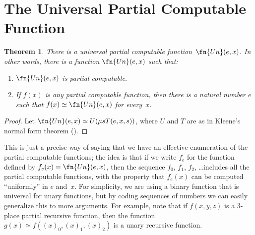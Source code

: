 \documentclass[10pt,a4paper]{article}
\makeatletter
\theoremstyle{plain}
\newtheorem{thm}{Theorem}[section]
\theoremstyle{definition}
\theoremstyle{remark}
\newenvironment{explain}{}{}
\newcommand*{\olfileid}[3]{}
\newcommand*{\olsection}[1]{\section*{#1}}
\newcommand*{\ollabel}[1]{\label{#1}}
\newcommand{\olref}{\@ifnextchar[{\olref@i}{\olref@final}}
\def\olref@i[#1]{\@ifnextchar[{\olref@ii}{\olref@final}}
\def\olref@ii[#1]{\@ifnextchar[{\olref@iii}{\olref@final}}
\def\olref@iii[#1]{\olref@final}
\def\olref@final#1{\ref{#1}}
\providecommand{\umin}{\mu}
\makeatother
\begin{document}
\olfileid{cmp}{thy}{uni}
\olsection{The Universal Partial Computable Function}

\begin{thm}
\ollabel{thm:univ-comp}
There is a universal partial computable function~$\fn{Un}(e,x)$. In other
words, there is a function $\fn{Un}(e,x)$ such that:
\begin{enumerate}
\item $\fn{Un}(e,x)$ is partial computable.
\item If $f(x)$ is any partial computable function, then there is a
natural number $e$ such that $f(x) \simeq \fn{Un}(e,x)$ for every~$x$.
\end{enumerate}
\end{thm}

\begin{proof}
Let $\fn{Un}(e,x) \simeq U(\umin{s}{T(e,x,s)})$, where $U$ and $T$ are
as in Kleene's normal form theorem (\olref[nfm]{thm:normal-form}).
\end{proof}

\begin{explain}
This is just a precise way of saying that we have an effective
enumeration of the partial computable functions; the idea is that if
we write $f_e$ for the function defined by $f_e(x) = \fn{Un}(e,x)$,
then the sequence $f_0$, $f_1$, $f_2$, \dots includes all the partial
computable functions, with the property that $f_e(x)$ can be computed
``uniformly'' in $e$ and~$x$. For simplicity, we are using a binary
function that is universal for unary functions, but by coding
sequences of numbers we can easily generalize this to more arguments.
For example, note that if $f(x,y,z)$ is a $3$-place partial recursive
function, then the function $g(x) \simeq f((x)_0, (x)_1, (x)_2)$ is a
unary recursive function.
\end{explain}
\end{document}
